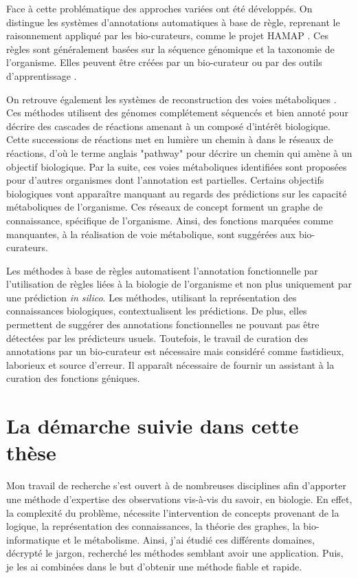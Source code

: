 \begin{refsegment}
Face à cette problématique des approches variées ont été développés. On distingue les systèmes d'annotations automatiques à base de règle, reprenant le raisonnement appliqué par les bio-curateurs, comme le projet HAMAP \cite{lima2009hamap}. Ces règles sont généralement basées sur la séquence génomique et la taxonomie de l'organisme. Elles peuvent être créées par un bio-curateur ou par des outils d'apprentissage \cite{uniprot2011ongoing}.

On retrouve également les systèmes de reconstruction des voies métaboliques \cite{karpe2011pathway}. Ces méthodes utilisent des génomes complétement séquencés et bien annoté pour décrire des cascades de réactions amenant à un composé d'intérêt biologique.  Cette successions de réactions met en lumière un chemin à dans le réseaux de réactions, d'où le terme anglais "pathway" pour décrire un chemin qui amène à un objectif biologique. Par la suite, ces voies métaboliques identifiées sont proposées pour d'autres organismes dont l'annotation est partielles. Certains objectifs biologiques vont apparaître manquant au regards des prédictions sur les capacité métaboliques de l'organisme. Ces réseaux de concept forment un graphe de connaissance, spécifique de l'organisme. Ainsi, des fonctions marquées comme manquantes, à la réalisation de voie métabolique, sont suggérées aux bio-curateurs.

Les méthodes à base de règles automatisent l'annotation fonctionnelle par l'utilisation de règles liées à la biologie de l'organisme et non plus uniquement par une prédiction \textit{in silico}. Les méthodes, utilisant la représentation des connaissances biologiques, contextualisent les prédictions. De plus, elles permettent de suggérer des annotations fonctionnelles ne pouvant pas être détectées par les prédicteurs usuels. Toutefois, le travail de curation des annotations par un bio-curateur est nécessaire mais considéré comme fastidieux, laborieux et source d'erreur. Il apparaît nécessaire de fournir un assistant à la curation des fonctions géniques.

\section*{La démarche suivie dans cette thèse}

Mon travail de recherche s'est ouvert à de nombreuses disciplines afin d'apporter une méthode d'expertise des observations vis-à-vis du savoir, en biologie. En effet, la complexité du problème, nécessite l'intervention de concepts provenant de la logique, la représentation des connaissances, la théorie des graphes, la bio-informatique et le métabolisme. Ainsi, j'ai étudié ces différents domaines, décrypté le jargon, recherché les méthodes semblant avoir une application. Puis, je les ai combinées dans le but d'obtenir une méthode fiable et rapide.


\end{refsegment}
